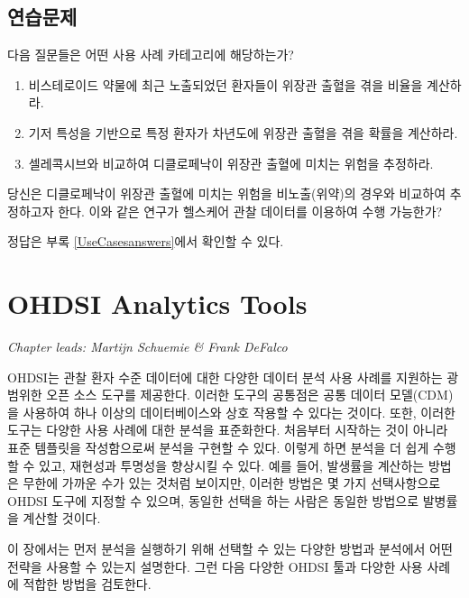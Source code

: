 \documentclass[11pt]{book}
\theoremstyle{definition}
\theoremstyle{definition}
\theoremstyle{definition}
\theoremstyle{remark}
\let\BeginKnitrBlock\begin \let\EndKnitrBlock\end
\begin{document}
\section{연습문제}

\BeginKnitrBlock{exercise}
\protect\hypertarget{exr:exerciseUseCases1}{}{\label{exr:exerciseUseCases1}
}다음 질문들은 어떤 사용 사례 카테고리에 해당하는가?

\begin{enumerate}
\def\labelenumi{\arabic{enumi}.}
\item
  비스테로이드 약물에 최근 노출되었던 환자들이 위장관 출혈을 겪을 비율을
  계산하라.
\item
  기저 특성을 기반으로 특정 환자가 차년도에 위장관 출혈을 겪을 확률을
  계산하라.
\item
  셀레콕시브와 비교하여 디클로페낙이 위장관 출혈에 미치는 위험을
  추정하라.
\end{enumerate}
\EndKnitrBlock{exercise}

\BeginKnitrBlock{exercise}
\protect\hypertarget{exr:exerciseUseCases2}{}{\label{exr:exerciseUseCases2}
}당신은 디클로페낙이 위장관 출혈에 미치는 위험을 비노출(위약)의 경우와
비교하여 추정하고자 한다. 이와 같은 연구가 헬스케어 관찰 데이터를
이용하여 수행 가능한가?
\EndKnitrBlock{exercise}

정답은 부록 \ref{UseCasesanswers}에서 확인할 수 있다.

\chapter{OHDSI Analytics Tools}\label{OhdsiAnalyticsTools}

\emph{Chapter leads: Martijn Schuemie \& Frank DeFalco}

OHDSI는 관찰 환자 수준 데이터에 대한 다양한 데이터 분석 사용 사례를
지원하는 광범위한 오픈 소스 도구를 제공한다. 이러한 도구의 공통점은 공통
데이터 모델(CDM)을 사용하여 하나 이상의 데이터베이스와 상호 작용할 수
있다는 것이다. 또한, 이러한 도구는 다양한 사용 사례에 대한 분석을
표준화한다. 처음부터 시작하는 것이 아니라 표준 템플릿을 작성함으로써
분석을 구현할 수 있다. 이렇게 하면 분석을 더 쉽게 수행할 수 있고,
재현성과 투명성을 향상시킬 수 있다. 예를 들어, 발생률을 계산하는 방법은
무한에 가까운 수가 있는 것처럼 보이지만, 이러한 방법은 몇 가지
선택사항으로 OHDSI 도구에 지정할 수 있으며, 동일한 선택을 하는 사람은
동일한 방법으로 발병률을 계산할 것이다.

이 장에서는 먼저 분석을 실행하기 위해 선택할 수 있는 다양한 방법과
분석에서 어떤 전략을 사용할 수 있는지 설명한다. 그런 다음 다양한 OHDSI
툴과 다양한 사용 사례에 적합한 방법을 검토한다.
\end{document}
